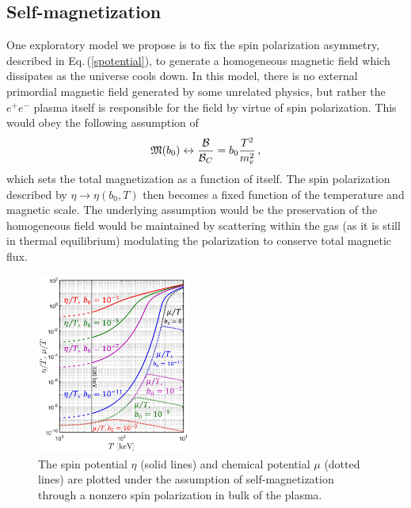 \documentclass[reprint]{revtex4-2}
\newcommand{\req}[1]{Eq.\,(\ref{#1})}
\begin{document}
\subsection{Self-magnetization}
\label{sec:self}
\noindent One exploratory model we propose is to fix the spin polarization asymmetry, described in \req{spotential}, to generate a homogeneous magnetic field which dissipates as the universe cools down. In this model, there is no external primordial magnetic field generated by some unrelated physics, but rather the $e^{+}e^{-}$ plasma itself is responsible for the field by virtue of spin polarization. This would obey the following assumption of
\begin{align}
    \label{selfmag}
    {\mathfrak M}(b_{0})\leftrightarrow\frac{\cal B}{{\cal B}_{C}}=b_{0}\frac{T^{2}}{m_{e}^{2}}\,,
\end{align}
which sets the total magnetization as a function of itself. The spin polarization described by $\eta\rightarrow\eta(b_{0},T)$ then becomes a fixed function of the temperature and magnetic scale. The underlying assumption would be the preservation of the homogeneous field would be maintained by scattering within the gas (as it is still in thermal equilibrium) modulating the polarization to conserve total magnetic flux.

\begin{figure}[ht]
    \centering
    \includegraphics[width=0.45\textwidth]{plots/Spinchemical_03.png}
    \caption{The spin potential $\eta$ (solid lines) and chemical potential $\mu$ (dotted lines) are plotted under the assumption of self-magnetization through a nonzero spin polarization in bulk of the plasma.}
    \label{fig:self} 
\end{figure}
\end{document}
